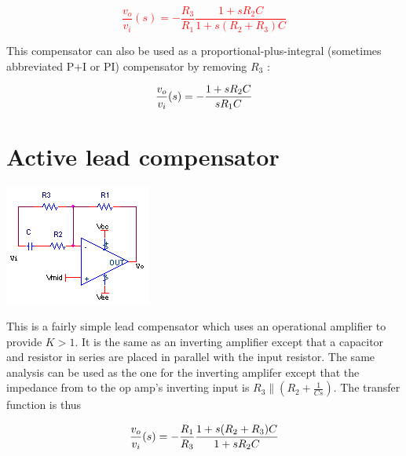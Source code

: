 \textcolor{red}{
\begin{equation}
\frac{v_{o}}{v_{i}}(s) = -\frac{R_{3}}{R_{1}}\frac{1+sR_{2}C}{1+s(R_{2} + R_{3})C}
\label{eq:activelag}
\end{equation}
}

This compensator can also be used as a proportional-plus-integral (sometimes abbreviated P+I or PI) compensator by removing $R_3$ \autocite[270]{analog-design-feedback-lundberg}:

\textcolor{red}{
\begin{equation}
\frac{v_o}{v_i}(s) = - \frac{1+sR_2 C}{sR_1 C}
\label{eq:P+I}
\end{equation}
}

\section{Active lead compensator}
\begin{center}
	\includegraphics{schematics/activelead.PNG}
\end{center}
This is a fairly simple lead compensator which uses an operational amplifier to provide $K > 1$. It is the same as an inverting amplifier except that a capacitor and resistor in series are placed in parallel with the input resistor. The same analysis can be used as the one for the inverting amplifer except that the impedance from \vin to the op amp's inverting input is $R_3 \parallel (R_2 + \frac{1}{Cs})$. The transfer function \autocite[278]{analog-design-feedback-lundberg} is thus

\textcolor{red}{
\begin{equation}
\frac{v_o}{v_i}(s) = -\frac{R_1}{R_3}\frac{1+s(R_2 + R_3)C}{1+sR_2C}
\label{eq:activelead}
\end{equation}
}

